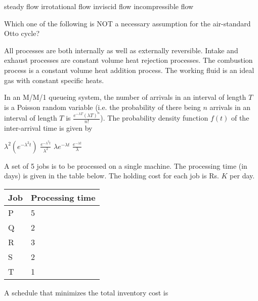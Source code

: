 \documentclass[addpoints,10pt]{exam}
\begin{document}
\begin{questions}
    \begin{choices}
        \choice steady flow
        \choice irrotational flow
        \choice inviscid flow
        \choice incompressible flow
    \end{choices}

    \question Which one of the following is NOT a necessary assumption for the air-standard Otto cycle?

    \begin{choices}
        \choice All processes are both internally as well as externally reversible.
        \choice Intake and exhaust processes are constant volume heat rejection processes.
        \choice The combustion process is a constant volume heat addition process.
        \choice The working fluid is an ideal gas with constant specific heats.
    \end{choices}

    \question In an M/M/1 queueing system, the number of arrivals in an interval of length $T$ is a Poisson random variable (i.e. the probability of there being $n$ arrivals in an interval of length $T$ is $\frac{e^{-\lambda T}(\lambda T)^n}{n!}$). The probability density function $f(t)$ of the inter-arrival time is given by

    \begin{oneparchoices}
        \choice $\lambda^2(e^{-\lambda^2t})$
        \choice $\frac{e^{-\lambda^2t}}{\lambda^2}$
        \choice $\lambda e^{-\lambda t}$
        \choice $\frac{e^{-\lambda t}}{\lambda}$
    \end{oneparchoices}

    \question A set of 5 jobs is to be processed on a single machine. The processing time (in days) is given in the table below. The holding cost for each job is Rs. $K$ per day.\\
    \begin{center}
        \begin{tabular}{|l|l|}
            \hline
            \textbf{Job} & \textbf{Processing time} \\\hline
            P            & 5                        \\\hline
            Q            & 2                        \\\hline
            R            & 3                        \\\hline
            S            & 2                        \\\hline
            T            & 1                        \\
            \hline
        \end{tabular}
    \end{center}
    A schedule that minimizes the total inventory cost is


\end{questions}
\end{document}
